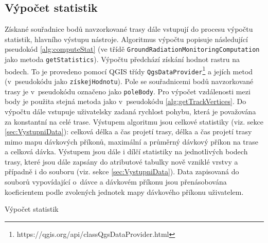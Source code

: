 \subsection{Výpočet statistik}
\label{subsec:vypocetStatistik}
Získané souřadnice bodů navzorkované trasy dále vstupují do procesu výpočtu statistik, hlavního výstupu nástroje. Algoritmus výpočtu popisuje následující pseudokód \ref{alg:computeStat} (ve třídě \texttt{GroundRadiationMonitoringComputation} jako metoda \texttt{getStatistics}). Výpočtu předchází získání hodnot rastru na bodech. To je provedeno pomocí QGIS třídy \texttt{QgsDataProvider}\footnote{https://qgis.org/api/classQgsDataProvider.html} a jejích metod (v~pseudokódu jako \texttt{získejHodnotu}). Pole se souřadnicemi bodů navzorkované trasy je v~pseudokódu označeno jako \texttt{poleBody}. Pro výpočet vzdálenosti mezi body je použita stejná metoda jako v~pseudokódu \ref{alg:getTrackVertices}. Do výpočtu dále vstupuje uživatelsky zadaná rychlost pohybu, která je považována za konstantní na celé trase. Výstupem algoritmu jsou celkové statistiky (viz. sekce \ref{sec:VystupniData}): celková délka a čas projetí trasy, délka  a čas projetí trasy mimo mapu dávkových příkonů, maximální a průměrný dávkový příkon na trase a celková dávka. Výstupem jsou dále i dílčí statistiky na jednotlivých bodech trasy, které jsou dále zapsány do atributové tabulky nově vzniklé vrstvy a případně i do  souboru (viz. sekce \ref{sec:VystupniData}). Data zapisovaná do souborů vypovídající o~dávce a dávkovém příkonu jsou přenásobována koeficientem podle zvolených jednotek mapy dávkového příkonu uživatelem. 


\begin{algorithm}
\caption{Výpočet statistik}
\label{alg:computeStat}
	\begin{algorithmic}[1]

			\ELSE
			\ENDIF
			


		\end{algorithmic}
		\end{algorithm}

